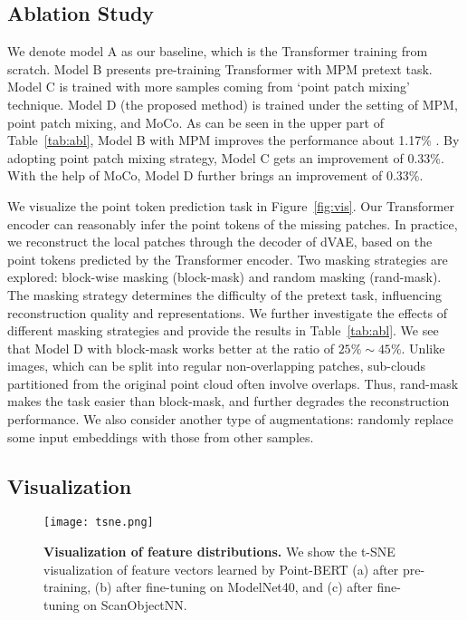 \subsection{Ablation Study}
 We denote model A as our baseline, which is the Transformer training from scratch. Model B presents pre-training Transformer with MPM pretext task. Model C is trained with more samples coming from `point patch mixing' technique. Model D (the proposed method) is trained under the setting of MPM, point patch mixing, and MoCo.  As can be seen in the upper part of Table~\ref{tab:abl}, Model B with MPM improves the performance about 1.17\% .  By adopting point patch mixing strategy, Model C gets an improvement of 0.33\%. With the help of MoCo\cite{moco}, Model D further brings an improvement of 0.33\%. 

  We visualize the point token prediction task in Figure~\ref{fig:vis}. Our Transformer encoder can reasonably infer the point tokens of the missing patches. In practice, we reconstruct the local patches through the decoder of dVAE, based on the point tokens predicted by the Transformer encoder. Two masking strategies are explored: block-wise masking (block-mask) and random masking (rand-mask). The masking strategy determines the difficulty of the pretext task, influencing reconstruction quality and representations. We further investigate the effects of different masking strategies and provide the results in Table~\ref{tab:abl}. We see that Model D with block-mask works better at the ratio of $ 25\% \sim 45 \% $.
Unlike images, which can be split into regular non-overlapping patches, sub-clouds partitioned from the original point cloud often involve overlaps. Thus, rand-mask makes the task easier than block-mask, and further degrades the reconstruction performance.  We also consider another type of augmentations: randomly replace some input embeddings with those from other samples.%

\subsection{Visualization}

\begin{figure}[t]
\centering \texttt{[image: tsne.png]}
\caption{\small \textbf{Visualization of feature distributions.} We show the t-SNE visualization of feature vectors learned by Point-BERT (a) after pre-training, (b)  after fine-tuning on ModelNet40, and (c) after fine-tuning on ScanObjectNN.}
\vspace{-10pt}
\label{fig:tsne}
\end{figure}

